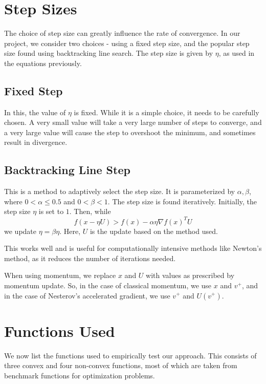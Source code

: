\documentclass{article}
\begin{document}
\section{Step Sizes}\label{step}
The choice of step size can greatly influence the rate of convergence. In our project, we consider two choices - using a fixed step size, and the popular step size found using backtracking line search. The step size is given by $\eta$, as used in the equations previously.

\subsection{Fixed Step}
In this, the value of $\eta$ is fixed. While it is a simple choice, it needs to be carefully chosen. A very small value will take a very large number of steps to converge, and a very large value will cause the step to overshoot the minimum, and sometimes result in divergence.

\subsection{Backtracking Line Step}
This is a method to adaptively select the step size. It is parameterized by $\alpha,\beta$, where $0<\alpha\le0.5$ and $0<\beta<1$. The step size is found iteratively. Initially, the step size $\eta$ is set to $1$. Then, while
\begin{equation}
f(x-\eta U) > f(x) - \alpha \eta \nabla f(x)^T U
\end{equation}
we update $\eta = \beta \eta$. Here, $U$ is the update based on the method used.

This works well and is useful for computationally intensive methods like Newton's method, as it reduces the number of iterations needed.

When using momentum, we replace $x$ and $U$ with values as prescribed by momentum update. So, in the case of classical momentum, we use $x$ and $v^+$, and in the case of Nesterov's accelerated gradient, we use $v^+$ and $U(v^+)$.

\section{Functions Used}\label{functions}
We now list the functions used to empirically test our approach. This consists of three convex and four non-convex functions, most of which are taken from benchmark functions for optimization problems.
\end{document}
